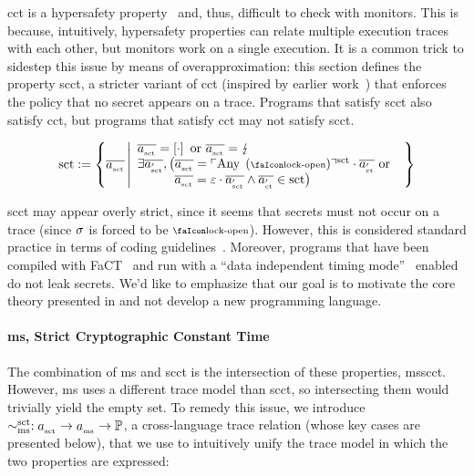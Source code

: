 \documentclass[a4paper,12pt]{article}
\begin{document}
\gls*{cct} is a hypersafety property~\cite{barthe2018sec} and, thus, difficult to check with monitors.
This is because, intuitively, hypersafety properties can relate multiple execution traces with each other, but monitors work on a single execution.
It is a common trick to sidestep this issue by means of overapproximation: this section defines the property \gls*{scct}, a stricter variant of \gls*{cct} (inspired by earlier work~\cite{almeida2017jasmin}) that enforces the policy that no secret appears on a trace.
Programs that satisfy \gls*{scct} also satisfy \gls*{cct}, but programs that satisfy \gls*{cct} may not satisfy \gls*{scct}.

\begin{definition}{}
  \noindent\[
  \scctsafe:=\left\{\scctTrace 
      \left|
        \begin{array}{l}
          \scctTrace=\hole{\cdot} \text{ or } \scctTrace=\lightning \\
          \exists\scctTrace['],\left(\scctTrace=\scctAny[\unlock]\cdot\varTrace[_{\ctsafe}'] \text{ or } \right.\\
          \hspace{2.8em}\left.\scctTrace=\emptyevent\cdot\scctTrace[']
          \wedge \varTrace[_{\ctsafe}']\in\scctsafe \right)
        \end{array}
      \right.
    \right\}
  \]
\end{definition}

\gls*{scct} may appear overly strict, since it seems that secrets must not occur on a trace (since $\sigma_{}$ is forced to be $\unlock$). 
However, this is considered standard practice in terms of coding guidelines~\cite{ctguidelines}.
Moreover, programs that have been compiled with FaCT~\cite{cauligi2019fact} and run with a ``data independent timing mode''~\cite{arm-refman,intel-refman} enabled do not leak secrets. 
We'd like to emphasize that our goal is to motivate the core theory presented in  and not develop a new programming language.

\paragraph{\gls*{ms}, Strict Cryptographic Constant Time}

The combination of \gls*{ms} and \gls*{scct} is the intersection of these properties, \gls*{msscct}.
However, \gls*{ms} uses a different trace model than \gls*{scct}, so intersecting them would trivially yield the empty set. 
To remedy this issue, we introduce $\sim^{\text{sct}}_{\text{ms}} : a_{_{\text{sct}}} \to a_{_{\text{ms}}} \to \mathbb{P}$, a cross-language trace relation (whose key cases are presented below), that we use to intuitively unify the trace model in which the two properties are expressed:
\end{document}
